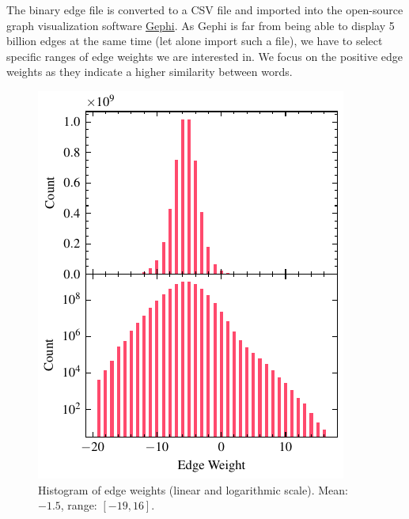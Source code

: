 The binary edge file is converted to a CSV file and imported into the open-source graph visualization software \href{https://gephi.org/}{Gephi}. As Gephi is far from being able to display 5 billion edges at the same time (let alone import such a file), we have to select specific ranges of edge weights we are interested in. We focus on the positive edge weights as they indicate a higher similarity between words.

\vfill\null

\begin{figure}[H]
    \centering
    \includegraphics[width=\linewidth]{assets/edge_weights.pdf}
    \caption{Histogram of edge weights (linear and logarithmic scale). Mean: $-1.5$, range: $[-19, 16]$.}
    \label{fig:hist}
\end{figure}

